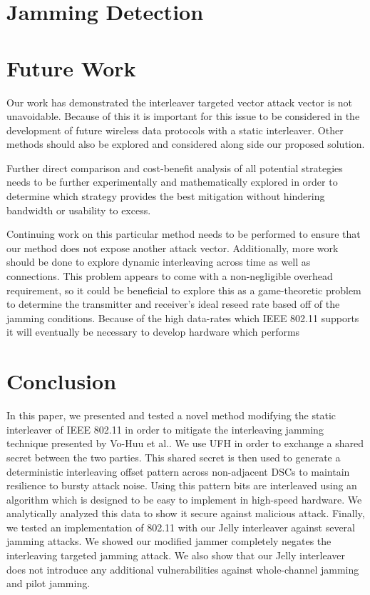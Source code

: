 \documentclass[sigconf]{acmart}
\begin{document}
\section{Jamming Detection}



\section{Future Work}
\label{sec:continuing}

Our work has demonstrated the interleaver targeted vector attack vector is not unavoidable. Because of this it is important for this issue to be considered in the development of future wireless data protocols with a static interleaver. Other methods should also be explored and considered along side our proposed solution.

Further direct comparison and cost-benefit analysis of all potential strategies needs to be further experimentally and mathematically explored in order to determine which strategy provides the best mitigation without hindering bandwidth or usability to excess.

Continuing work on this particular method needs to be performed to ensure that our method does not expose another attack vector. Additionally, more work should be done to explore dynamic interleaving across time as well as connections. This problem appears to come with a non-negligible overhead requirement, so it could be beneficial to explore this as a game-theoretic problem to determine the transmitter and receiver's ideal reseed rate based off of the jamming conditions. Because of the high data-rates which IEEE 802.11 supports it will eventually be necessary to develop hardware which performs 

\section{Conclusion}
\label{sec:conclusion}

In this paper, we  presented and tested a novel method modifying the static interleaver of IEEE 802.11 in order to mitigate the interleaving jamming technique presented by Vo-Huu et al.. We use UFH in order to exchange a shared secret between the two parties. This shared secret is then used to generate a deterministic interleaving offset pattern across non-adjacent DSCs to maintain resilience to bursty attack noise. Using this pattern bits are interleaved using an algorithm which is designed to be easy to implement in high-speed hardware. We analytically analyzed this data to show it secure against malicious attack. Finally, we tested an implementation of 802.11 with our Jelly interleaver against several jamming attacks. We showed our modified jammer completely negates the interleaving targeted jamming attack. We also show that our Jelly interleaver does not introduce any additional vulnerabilities against whole-channel jamming and pilot jamming. 
\end{document}
